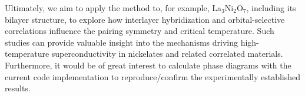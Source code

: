 \documentclass[../main.tex]{subfiles}
\begin{document}
Ultimately, we aim to apply the method to, for example, La$_3$Ni$_2$O$_7$, including its bilayer structure, to explore how interlayer hybridization and orbital-selective correlations influence the pairing symmetry and critical temperature. Such studies can provide valuable insight into the mechanisms driving high-temperature superconductivity in nickelates and related correlated materials. Furthermore, it would be of great interest to calculate phase diagrams with the current code implementation to reproduce/confirm the experimentally established results.
\end{document}
